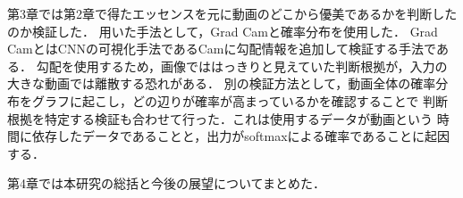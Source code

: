 第3章では第2章で得たエッセンスを元に動画のどこから優美であるかを判断したのか検証した．
用いた手法として，Grad Cam\cite{gradcam}と確率分布を使用した．
Grad CamとはCNNの可視化手法であるCam\cite{cam}に勾配情報を追加して検証する手法である．
勾配を使用するため，画像でははっきりと見えていた判断根拠が，入力の大きな動画では離散する恐れがある．
別の検証方法として，動画全体の確率分布をグラフに起こし，どの辺りが確率が高まっているかを確認することで
判断根拠を特定する検証も合わせて行った．これは使用するデータが動画という
時間に依存したデータであることと，出力がsoftmaxによる確率であることに起因する．

第4章では本研究の総括と今後の展望についてまとめた．
